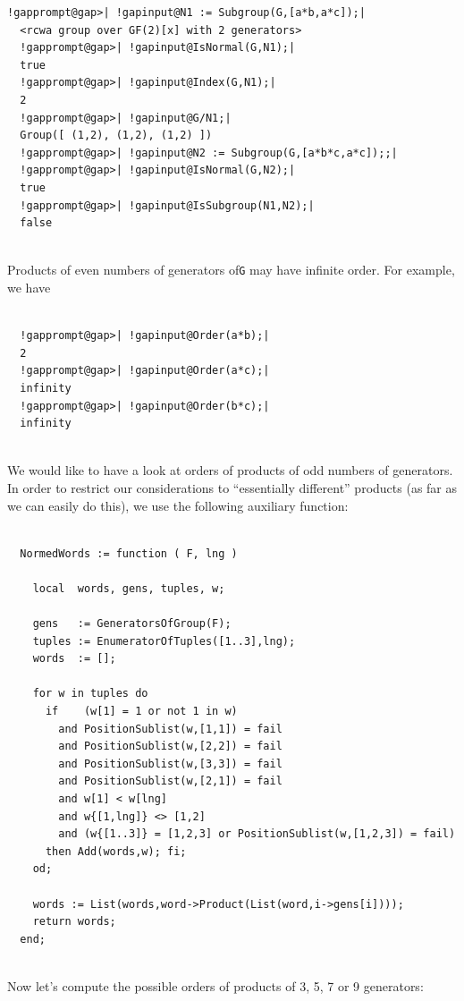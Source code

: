 \documentclass[a4paper,11pt]{report}
\begin{document}
{{\begin{Verbatim}[commandchars=!@|,fontsize=\small,frame=single,label=Example]
  !gapprompt@gap>| !gapinput@N1 := Subgroup(G,[a*b,a*c]);|
  <rcwa group over GF(2)[x] with 2 generators>
  !gapprompt@gap>| !gapinput@IsNormal(G,N1);|
  true
  !gapprompt@gap>| !gapinput@Index(G,N1);|
  2
  !gapprompt@gap>| !gapinput@G/N1;|
  Group([ (1,2), (1,2), (1,2) ])
  !gapprompt@gap>| !gapinput@N2 := Subgroup(G,[a*b*c,a*c]);;|
  !gapprompt@gap>| !gapinput@IsNormal(G,N2);|
  true
  !gapprompt@gap>| !gapinput@IsSubgroup(N1,N2);|
  false
  
\end{Verbatim}
 Products of even numbers of generators of{\nobreakspace}\texttt{G} may have infinite order. For example, we have 
\begin{Verbatim}[commandchars=!@|,fontsize=\small,frame=single,label=Example]
  
  !gapprompt@gap>| !gapinput@Order(a*b);|
  2
  !gapprompt@gap>| !gapinput@Order(a*c);|
  infinity
  !gapprompt@gap>| !gapinput@Order(b*c);|
  infinity
  
\end{Verbatim}
 We would like to have a look at orders of products of odd numbers of
generators. In order to restrict our considerations to ``essentially different'' products (as far as we can easily do this), we use the following auxiliary
function: 
\begin{Verbatim}[commandchars=!@|,fontsize=\small,frame=single,label=GAP code]
  
  NormedWords := function ( F, lng )
  
    local  words, gens, tuples, w;
  
    gens   := GeneratorsOfGroup(F);
    tuples := EnumeratorOfTuples([1..3],lng);
    words  := [];
  
    for w in tuples do
      if    (w[1] = 1 or not 1 in w)
        and PositionSublist(w,[1,1]) = fail
        and PositionSublist(w,[2,2]) = fail
        and PositionSublist(w,[3,3]) = fail
        and PositionSublist(w,[2,1]) = fail
        and w[1] < w[lng]
        and w{[1,lng]} <> [1,2]
        and (w{[1..3]} = [1,2,3] or PositionSublist(w,[1,2,3]) = fail)
      then Add(words,w); fi;
    od;
  
    words := List(words,word->Product(List(word,i->gens[i])));
    return words;
  end;
  
\end{Verbatim}
 Now let's compute the possible orders of products of 3, 5, 7 or 9 generators: 
\begin{Verbatim}[commandchars=!@|,fontsize=\small,frame=single,label=Example]
  

\end{Verbatim}}}
\end{document}

